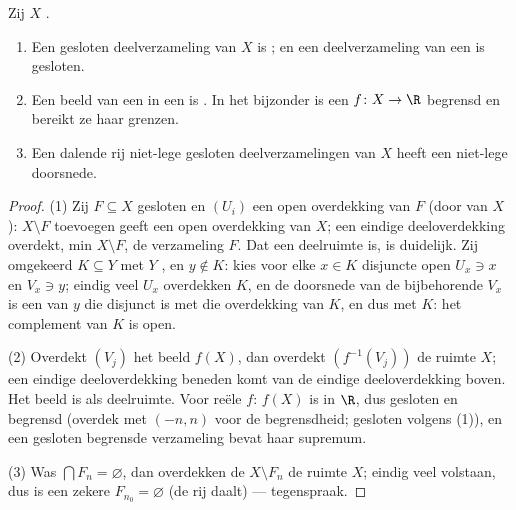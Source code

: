 \begin{theorem}\label{thm:b3:topology:compactprops}
Zij $X$ .
\begin{enumerate}
  \item Een gesloten deelverzameling van $X$ is ; en een
         deelverzameling van een  is
        gesloten.
  \item Een  beeld van een  in een
         is . In het bijzonder is een
         $f\colon X \to \R$ begrensd en bereikt ze haar
        grenzen.
  \item Een dalende rij niet-lege gesloten deelverzamelingen van
        $X$ heeft een niet-lege doorsnede.
\end{enumerate}
\end{theorem}

\begin{proof}
(1) Zij $F \subseteq X$ gesloten en $(U_i)$ een open overdekking
van $F$ (door  van $X$): $X \setminus F$
toevoegen geeft een open overdekking van $X$; een eindige
deeloverdekking overdekt, min $X \setminus F$, de verzameling $F$.
Dat een deelruimte  is, is duidelijk. Zij omgekeerd $K
\subseteq Y$  met $Y$ , en $y \notin K$: kies voor
elke $x \in K$ disjuncte open $U_x \ni x$ en $V_x \ni y$; eindig
veel $U_x$ overdekken $K$, en de doorsnede van de bijbehorende
$V_x$ is een  van $y$ die disjunct is met die overdekking
van $K$, en dus met $K$: het complement van $K$ is open.

(2) Overdekt $(V_j)$ het beeld $f(X)$, dan overdekt
$(f^{-1}(V_j))$ de ruimte $X$; een eindige deeloverdekking beneden
komt van de eindige deeloverdekking boven. Het beeld is 
als deelruimte. Voor reële $f$: $f(X)$ is  in $\R$, dus
gesloten en begrensd (overdek met $(-n, n)$ voor de
begrensdheid; gesloten volgens (1)), en een gesloten begrensde
verzameling bevat haar supremum.

(3) Was $\bigcap F_n = \varnothing$, dan overdekken de  $X \setminus F_n$ de ruimte $X$; eindig veel
volstaan, dus is een zekere $F_{n_0} = \varnothing$ (de rij daalt)
--- tegenspraak.
\end{proof}

